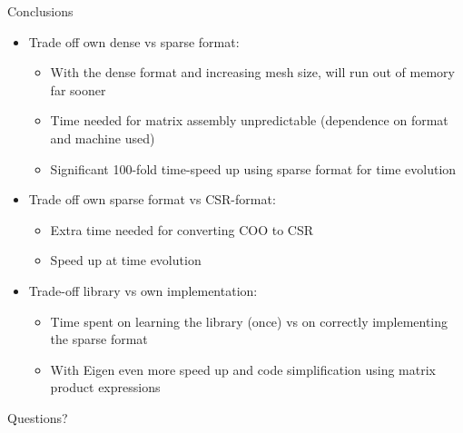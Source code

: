 \documentclass[aspectratio=169,xcolor=dvipsnames]{beamer}
\begin{document}
\begin{frame}{Conclusions}
   \begin{itemize}
      \item Trade off own dense vs sparse format:
   	 \begin{itemize}
   	  \item With the dense format and increasing mesh size, will run out of memory far sooner 
	  \item Time needed for matrix assembly unpredictable (dependence on format and machine used)
	  \item Significant 100-fold time-speed up using sparse format for time evolution
     \end{itemize}
   	 \item Trade off own sparse format vs CSR-format:
   	 \begin{itemize}
	  \item Extra time needed for converting COO to CSR 
	  \item Speed up at time evolution
	  
	  \end{itemize}
	  \item Trade-off library vs own implementation:
	  \begin{itemize}
	  \item Time spent on learning the library (once) vs on correctly implementing the sparse format
	  \item With Eigen even more speed up and code simplification using matrix product expressions
	  \end{itemize}
   \end{itemize}
\end{frame}


\begin{frame}
    \Huge{\centerline{Questions?}}
\end{frame}
\end{document}
